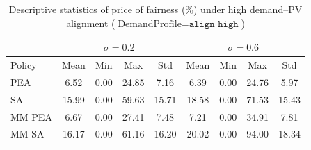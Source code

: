\begin{table}[h]
\centering
\caption{Descriptive statistics of price of fairness (\%) under high demand--PV alignment ($\text{DemandProfile}=\texttt{align\_high}$)}
\label{tab:price_of_fairness_demand_align_high}
\begin{tabular}{lcccccccc}
\hline
 & \multicolumn{4}{c}{$\sigma = 0.2$} & \multicolumn{4}{c}{$\sigma = 0.6$} \\
\hline
Policy & Mean & Min & Max & Std & Mean & Min & Max & Std \\
\hline
 PEA & 6.52 & 0.00 & 24.85 & 7.16 & 6.39 & 0.00 & 24.76 & 5.97 \\
 SA & 15.99 & 0.00 & 59.63 & 15.71 & 18.58 & 0.00 & 71.53 & 15.43 \\
 MM PEA & 6.67 & 0.00 & 27.41 & 7.48 & 7.21 & 0.00 & 34.91 & 7.81 \\
 MM SA & 16.17 & 0.00 & 61.16 & 16.20 & 20.02 & 0.00 & 94.00 & 18.34 \\
\hline
\end{tabular}
\end{table}
